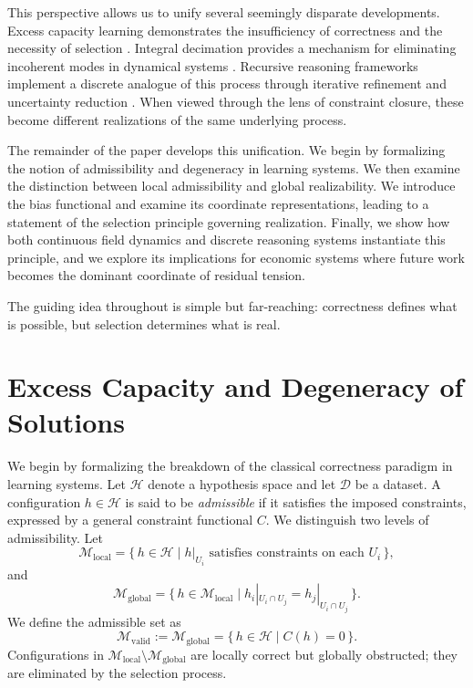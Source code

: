 \documentclass[11pt]{article}
\theoremstyle{plain}
\theoremstyle{definition}
\theoremstyle{remark}
\begin{document}
This perspective allows us to unify several seemingly disparate developments. Excess capacity learning demonstrates the insufficiency of correctness and the necessity of selection \cite{DubovaSloman2026, Belkin2019, Nakkiran2020}. Integral decimation provides a mechanism for eliminating incoherent modes in dynamical systems \cite{Grimm2026}. Recursive reasoning frameworks implement a discrete analogue of this process through iterative refinement and uncertainty reduction \cite{Cheng2025, Yao2023, Besta2024}. When viewed through the lens of constraint closure, these become different realizations of the same underlying process.

The remainder of the paper develops this unification. We begin by formalizing the notion of admissibility and degeneracy in learning systems. We then examine the distinction between local admissibility and global realizability. We introduce the bias functional and examine its coordinate representations, leading to a statement of the selection principle governing realization. Finally, we show how both continuous field dynamics and discrete reasoning systems instantiate this principle, and we explore its implications for economic systems where future work becomes the dominant coordinate of residual tension.

The guiding idea throughout is simple but far-reaching: correctness defines what is possible, but selection determines what is real.

\section{Excess Capacity and Degeneracy of Solutions}

We begin by formalizing the breakdown of the classical correctness paradigm in learning systems. Let $\mathcal{H}$ denote a hypothesis space and let $\mathcal{D}$ be a dataset. A configuration $h \in \mathcal{H}$ is said to be \emph{admissible} if it satisfies the imposed constraints, expressed by a general constraint functional $C$. We distinguish two levels of admissibility. Let
\[
\mathcal{M}_{\mathrm{local}} = \{\, h \in \mathcal{H} \mid h|_{U_i} \text{ satisfies constraints on each } U_i \,\},
\]
and
\[
\mathcal{M}_{\mathrm{global}} = \{\, h \in \mathcal{M}_{\mathrm{local}} \mid h_i|_{U_i \cap U_j} = h_j|_{U_i \cap U_j} \,\}.
\]
We define the admissible set as
\[
\mathcal{M}_{\mathrm{valid}} := \mathcal{M}_{\mathrm{global}} = \{\, h \in \mathcal{H} \mid C(h) = 0 \,\}.
\]
Configurations in $\mathcal{M}_{\mathrm{local}} \setminus \mathcal{M}_{\mathrm{global}}$ are locally correct but globally obstructed; they are eliminated by the selection process.
\end{document}
